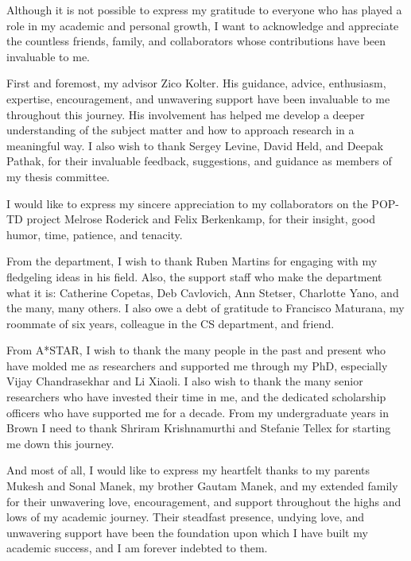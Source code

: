 \documentclass[12pt]{cmuthesis}
\begin{document}
\begin{acknowledgments}
	Although it is not possible to express my gratitude to everyone who has played a role in my academic and personal growth, I want to acknowledge and appreciate the countless friends, family, and collaborators whose contributions have been invaluable to me.

	First and foremost, my advisor Zico Kolter. His guidance, advice, enthusiasm, expertise, encouragement, and unwavering support have been invaluable to me throughout this journey. His involvement has helped me develop a deeper understanding of the subject matter and how to approach research in a meaningful way. I also wish to thank Sergey Levine, David Held, and Deepak Pathak, for their invaluable feedback, suggestions, and guidance as members of my thesis committee.

	I would like to express my sincere appreciation to my collaborators on the POP-TD project Melrose Roderick and Felix Berkenkamp, for their insight, good humor, time, patience, and tenacity.

	From the department, I wish to thank Ruben Martins for engaging with my fledgeling ideas in his field. Also, the support staff who make the department what it is: Catherine Copetas, Deb Cavlovich, Ann Stetser, Charlotte Yano, and the many, many others. I also owe a debt of gratitude to Francisco Maturana, my roommate of six years, colleague in the CS department, and friend.

	\clearpage

	From A*STAR, I wish to thank the many people in the past and present who have molded me as researchers and supported me through my PhD, especially Vijay Chandrasekhar and Li Xiaoli. I also wish to thank the many senior researchers who have invested their time in me, and the dedicated scholarship officers who have supported me for a decade. From my undergraduate years in Brown I need to thank Shriram Krishnamurthi and Stefanie Tellex for starting me down this journey.

	And most of all, I would like to express my heartfelt thanks to my parents Mukesh and Sonal Manek, my brother Gautam Manek, and my extended family for their unwavering love, encouragement, and support throughout the highs and lows of my academic journey. Their steadfast presence, undying love, and unwavering support have been the foundation upon which I have built my academic success, and I am forever indebted to them.
\end{acknowledgments}
\end{document}
